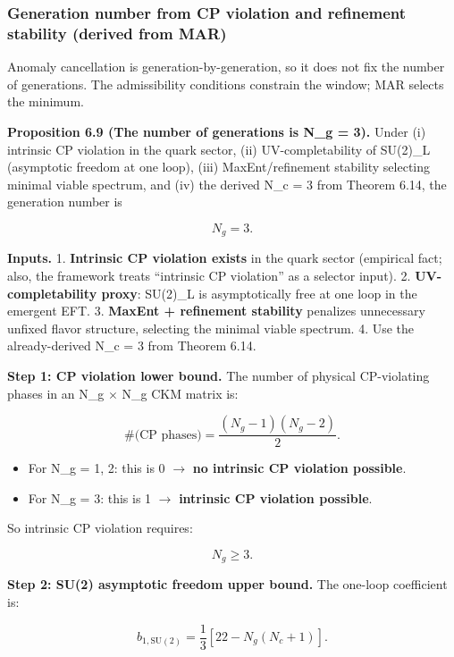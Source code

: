 \documentclass[11pt,a4paper]{article}
\theoremstyle{remark}
\providecommand{\tightlist}{%
  \setlength{\itemsep}{0pt}\setlength{\parskip}{0pt}}
\begin{document}
\subsubsection{Generation number from CP violation and refinement stability (derived from MAR)}\label{generation-number-from-cp-violation-and-refinement-stability-derived-from-mar}

Anomaly cancellation is generation-by-generation, so it does not fix the
number of generations. The admissibility conditions constrain the window;
MAR selects the minimum.

\textbf{Proposition 6.9 (The number of generations is N\_g = 3).} Under (i)
intrinsic CP violation in the quark sector, (ii) UV-completability of
SU(2)\_L (asymptotic freedom at one loop), (iii) MaxEnt/refinement
stability selecting minimal viable spectrum, and (iv) the derived N\_c = 3
from Theorem 6.14, the generation number is

\[
N_g = 3.
\]

\textbf{Inputs.}
1. \textbf{Intrinsic CP violation exists} in the quark sector (empirical fact;
also, the framework treats ``intrinsic CP violation'' as a selector input).
2. \textbf{UV-completability proxy}: SU(2)\_L is asymptotically free at one
loop in the emergent EFT.
3. \textbf{MaxEnt + refinement stability} penalizes unnecessary unfixed flavor
structure, selecting the minimal viable spectrum.
4. Use the already-derived N\_c = 3 from Theorem 6.14.

\textbf{Step 1: CP violation lower bound.} The number of physical CP-violating
phases in an N\_g \ensuremath{\times} N\_g CKM matrix is:

\[
\#\text{(CP phases)} = \frac{(N_g - 1)(N_g - 2)}{2}.
\]

\begin{itemize}
\tightlist
\item
  For N\_g = 1, 2: this is 0 \ensuremath{\to} \textbf{no intrinsic CP violation possible}.
\item
  For N\_g = 3: this is 1 \ensuremath{\to} \textbf{intrinsic CP violation possible}.
\end{itemize}

So intrinsic CP violation requires:

\[
N_g \ge 3.
\]

\textbf{Step 2: SU(2) asymptotic freedom upper bound.} The one-loop
coefficient is:

\[
b_{1,\mathrm{SU}(2)} = \frac{1}{3}\left[22 - N_g(N_c + 1)\right].
\]
\end{document}
